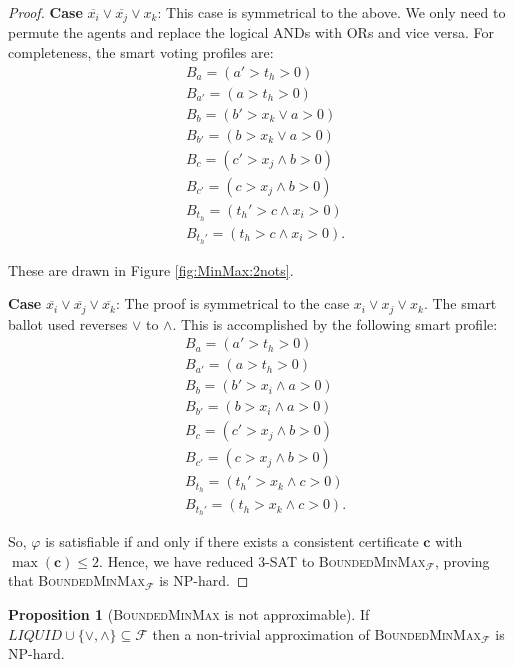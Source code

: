 \documentclass[11pt,a4paper, titlepage]{article}
\theoremstyle{definition}
\newtheorem{proposition}[theorem]{Proposition}
\let\vec\mathbf
\begin{document}
\begin{proof}
    \textbf{Case} $\overline{x_i} \lor \overline{x_j} \lor x_k$: This case is symmetrical to the above. We only need to permute the agents and replace the logical ANDs with ORs and vice versa. For completeness, the smart voting profiles are:     
    \begin{align*}
        &B_a = (a' > t_h > 0) \\
        &B_{a'} = (a > t_h > 0) \\
        &B_{b} = (b' > x_k \lor a > 0) \\
        &B_{b'} = (b > x_k \lor a > 0) \\
        &B_{c} = (c' > x_j \land b > 0) \\
        &B_{c'} = (c > x_j \land b > 0) \\
        &B_{t_h} = (t_h' > c \land x_i > 0) \\
        &B_{t_h'} = (t_h > c \land x_i > 0).
    \end{align*}

    These are drawn in Figure \ref{fig:MinMax:2nots}.

    \textbf{Case} $\overline{x_i} \lor \overline{x_j} \lor \overline{x_k}$: The proof is symmetrical to the case $x_i \lor x_j \lor x_k$. The smart ballot used reverses $\lor$ to $\land$. This is accomplished by the following smart profile:
    \begin{align*}
        &B_a = (a' > t_h > 0) \\
        &B_{a'} = (a > t_h > 0) \\
        &B_{b} = (b' > x_i \land a > 0) \\
        &B_{b'} = (b > x_i \land a > 0) \\
        &B_{c} = (c' > x_j \land b > 0) \\
        &B_{c'} = (c > x_j \land b > 0) \\
        &B_{t_h} = (t_h' > x_k \land c > 0) \\
        &B_{t_h'} = (t_h > x_k \land c > 0).
    \end{align*}

    So, $\varphi$ is satisfiable if and only if there exists a consistent certificate $\vec{c}$ with $\max(\vec{c}) \leq 2$. Hence, we have reduced \textsc{3-SAT} to \textsc{BoundedMinMax}$_\mathcal{F}$, proving that \textsc{BoundedMinMax}$_\mathcal{F}$ is NP-hard.
\end{proof}

\begin{proposition}[\textsc{BoundedMinMax} is not approximable]
    If $\mathit{LIQUID} \cup \{\lor, \land\} \subseteq \mathcal{F}$ then a non-trivial approximation of \textsc{BoundedMinMax}$_\mathcal{F}$ is NP-hard.
\end{proposition}
\end{document}
